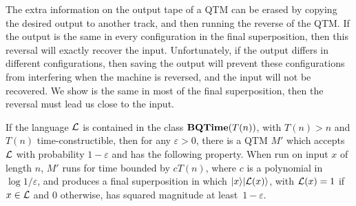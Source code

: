 The extra information on the output tape of a QTM can be erased by copying
the desired output to another track, and then running the reverse of the
QTM.  If the output is the same in every configuration in the final
superposition, then this reversal will exactly recover the input.
Unfortunately, if the output differs in different configurations, then saving
the output will prevent these configurations from interfering when the machine
is reversed, and the input will not be recovered. We show
is the same in most of the final superposition, then the reversal must
lead us close to the input.

\begin{theorem}
\label{bqp.clean}
If the language ${\cal L}$ is contained in the class $\mbox{\bf BQTime}(T(n))$, with
$T(n) > n$ and $T(n)$ time-constructible,
then for any $\varepsilon > 0$, there is a QTM $M'$ which accepts ${\cal L}$
with probability $1 - \varepsilon$ and has the following property.
When run on input $x$ of length $n$, $M'$ runs for time bounded by $c T(n)$,
where $c$ is a polynomial in $\log 1/\varepsilon$, and produces a final
superposition in which ${| x \rangle}{| {\cal L}(x) \rangle}$, with ${\cal L}(x) = 1$ if
$x \in {\cal L}$ and $0$ otherwise, has squared magnitude at
least~$1 - \varepsilon$.
\end{theorem}

